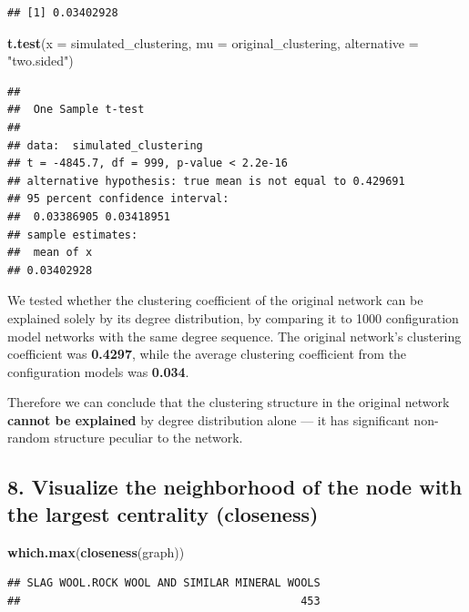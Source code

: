 \documentclass[
]{article}
\newenvironment{Shaded}{\begin{snugshade}}{\end{snugshade}}
\newcommand{\AttributeTok}[1]{\textcolor[rgb]{0.13,0.29,0.53}{#1}}
\newcommand{\FunctionTok}[1]{\textcolor[rgb]{0.13,0.29,0.53}{\textbf{#1}}}
\newcommand{\NormalTok}[1]{#1}
\newcommand{\StringTok}[1]{\textcolor[rgb]{0.31,0.60,0.02}{#1}}
\begin{document}
\begin{verbatim}
## [1] 0.03402928
\end{verbatim}

\begin{Shaded}
\begin{Highlighting}[]
\FunctionTok{t.test}\NormalTok{(}\AttributeTok{x =}\NormalTok{ simulated\_clustering, }\AttributeTok{mu =}\NormalTok{ original\_clustering, }\AttributeTok{alternative =} \StringTok{"two.sided"}\NormalTok{)}
\end{Highlighting}
\end{Shaded}

\begin{verbatim}
## 
##  One Sample t-test
## 
## data:  simulated_clustering
## t = -4845.7, df = 999, p-value < 2.2e-16
## alternative hypothesis: true mean is not equal to 0.429691
## 95 percent confidence interval:
##  0.03386905 0.03418951
## sample estimates:
##  mean of x 
## 0.03402928
\end{verbatim}

We tested whether the clustering coefficient of the original network can
be explained solely by its degree distribution, by comparing it to 1000
configuration model networks with the same degree sequence. The original
network's clustering coefficient was \textbf{0.4297}, while the average
clustering coefficient from the configuration models was \textbf{0.034}.

Therefore we can conclude that the clustering structure in the original
network \textbf{cannot be explained} by degree distribution alone --- it
has significant non-random structure peculiar to the network.

\subsection{8. Visualize the neighborhood of the node with the largest
centrality
(closeness)}\label{visualize-the-neighborhood-of-the-node-with-the-largest-centrality-closeness}

\begin{Shaded}
\begin{Highlighting}[]
\FunctionTok{which.max}\NormalTok{(}\FunctionTok{closeness}\NormalTok{(graph))}
\end{Highlighting}
\end{Shaded}

\begin{verbatim}
## SLAG WOOL.ROCK WOOL AND SIMILAR MINERAL WOOLS 
##                                           453
\end{verbatim}
\end{document}
